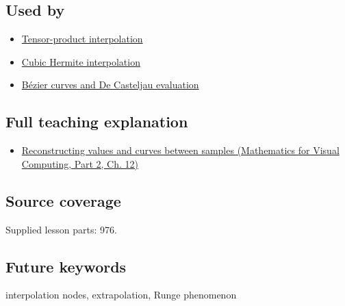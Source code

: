 \subsection{Used by}\label{appendix-0c2a5f69851e-used-by}

\hypertarget{appendix-0c2a5f69851e-used-by}{}

\begin{itemize}
\tightlist
\item
  \hyperref[appendix-0a09b6dfdc86]{Tensor-product interpolation}
\item
  \hyperref[appendix-db3aef8f2fd6]{Cubic Hermite interpolation}
\item
  \hyperref[appendix-ddbec701898c]{Bézier curves and De Casteljau evaluation}
\end{itemize}

\subsection{Full teaching explanation}\label{appendix-0c2a5f69851e-full-teaching-explanation}

\hypertarget{appendix-0c2a5f69851e-full-teaching-explanation}{}

\begin{itemize}
\tightlist
\item
  \href{../02-Mathematics-for-Visual-Computing-P02/main.pdf\#nameddest=02-foundations-ii-ch028-reconstructing-values-and-curves-between-samples}{Reconstructing values and curves between samples (Mathematics for Visual Computing, Part 2, Ch. 12)}
\end{itemize}

\subsection{Source coverage}\label{appendix-0c2a5f69851e-source-coverage}

\hypertarget{appendix-0c2a5f69851e-source-coverage}{}

Supplied lesson parts: 976.

\subsection{Future keywords}\label{appendix-0c2a5f69851e-future-keywords}

\hypertarget{appendix-0c2a5f69851e-future-keywords}{}

interpolation nodes, extrapolation, Runge phenomenon
